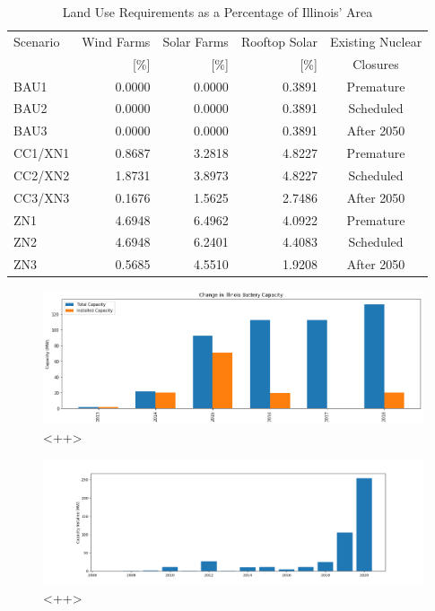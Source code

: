 \begin{table}[H]
  \centering
  \caption{Land Use Requirements as a Percentage of Illinois' Area}
  \label{tab:land-use}
  \begin{tabular}{lrrrc}
    \hline
    Scenario & Wind Farms & Solar Farms & Rooftop Solar & Existing Nuclear \\
    & [\%]& [\%]& [\%]&Closures \\
    \hline
    BAU1 & 0.0000 & 0.0000 & 0.3891 &Premature\\
    BAU2 & 0.0000 & 0.0000 & 0.3891 &Scheduled\\
    BAU3 & 0.0000 & 0.0000 & 0.3891 &After 2050\\
    CC1/XN1 & 0.8687 & 3.2818 & 4.8227 &Premature\\
    CC2/XN2 & 1.8731 & 3.8973 & 4.8227 &Scheduled\\
    CC3/XN3 & 0.1676 & 1.5625 & 2.7486 &After 2050\\
    ZN1 & 4.6948 & 6.4962 & 4.0922 &Premature\\
    ZN2 & 4.6948 & 6.2401 & 4.4083 &Scheduled\\
    ZN3 & 0.5685 & 4.5510 & 1.9208 &After 2050\\
    \hline
  \end{tabular}
\end{table}

\begin{figure}[H]
	\centering
	\includegraphics[width=\columnwidth]{./img/annual_installed_cap_battery.png}
	\caption{<++>}
	\label{fig:<++>}
\end{figure}


\begin{figure}[H]
	\centering
	\includegraphics[width=\columnwidth]{./img/annual_installed_cap_solar.png}
	\caption{<++>}
	\label{fig:<++>}
\end{figure}


